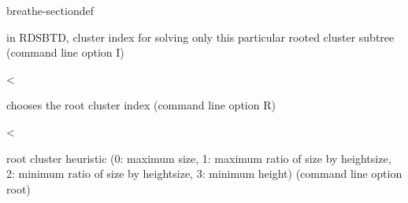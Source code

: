 \documentclass[letterpaper,10pt,openany,oneside,english]{sphinxmanual}
\begin{document}
\begin{fulllineitems}
\begin{sphinxuseclass}{breathe-sectiondef}
\begin{fulllineitems}
\sphinxAtStartPar
in RDS\sphinxhyphen{}BTD, cluster index for solving only this particular rooted cluster subtree (command line option \sphinxhyphen{}I) 

\end{fulllineitems}


\begin{fulllineitems}
\label{\detokenize{ref/ref_cpp:_CPPv4N8ToulBar213rootHeuristicE}}\label{\detokenize{ref/ref_cpp:_CPPv3N8ToulBar213rootHeuristicE}}\label{\detokenize{ref/ref_cpp:_CPPv2N8ToulBar213rootHeuristicE}}\label{\detokenize{ref/ref_cpp:ToulBar2::rootHeuristic__i}}
\pysigstartsignatures
\pysigstartmultiline
{}
\pysigstopmultiline
\pysigstopsignatures
\sphinxAtStartPar
\textless{} 

\sphinxAtStartPar
chooses the root cluster index (command line option \sphinxhyphen{}R) 

\end{fulllineitems}


\begin{fulllineitems}
\label{\detokenize{ref/ref_cpp:_CPPv4N8ToulBar212reduceHeightE}}\label{\detokenize{ref/ref_cpp:_CPPv3N8ToulBar212reduceHeightE}}\label{\detokenize{ref/ref_cpp:_CPPv2N8ToulBar212reduceHeightE}}\label{\detokenize{ref/ref_cpp:ToulBar2::reduceHeight__b}}
\pysigstartsignatures
\pysigstartmultiline
{}
\pysigstopmultiline
\pysigstopsignatures
\sphinxAtStartPar
\textless{} 

\sphinxAtStartPar
root cluster heuristic (0: maximum size, 1: maximum ratio of size by height\sphinxhyphen{}size, 2: minimum ratio of size by height\sphinxhyphen{}size, 3: minimum height) (command line option \sphinxhyphen{}root) 

\end{fulllineitems}


\end{sphinxuseclass}
\end{fulllineitems}
\end{document}

